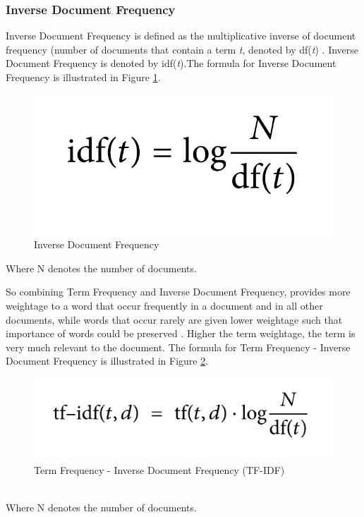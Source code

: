 \documentclass[a4paper,4pt]{article}
\begin{document}
\subsubsection{Inverse Document Frequency}
Inverse Document Frequency is defined as the multiplicative inverse of document frequency (number of documents that contain a term \textit{t},
denoted by df(\textit{t}) \cite{tfidf}. Inverse Document Frequency is denoted by idf(\textit{t}).The formula for Inverse Document Frequency 
is illustrated in Figure \ref{fig:idf}.
\begin{figure}[h]
    \centering
    \includegraphics[scale=0.32]{images/idf.png}
    \caption{Inverse Document Frequency}
    \label{fig:idf}
\end{figure}

Where N denotes the number of documents. \\ \par

So combining Term Frequency and Inverse Document Frequency, provides more weightage to a word that occur frequently in a document
and in all other documents, while words that occur rarely are given lower weightage such that importance of words could be preserved \cite{tfidf}.
Higher the term weightage, the term is very much relevant to the document.
The formula for Term Frequency - Inverse Document Frequency is illustrated in Figure \ref{fig:tfidf}.
\begin{figure}[h]
    \centering
    \includegraphics[scale=0.32]{images/tfidf.png}
    \caption{Term Frequency - Inverse Document Frequency (TF-IDF)}
    \label{fig:tfidf}
\end{figure}
\\
Where N denotes the number of documents.
\end{document}
